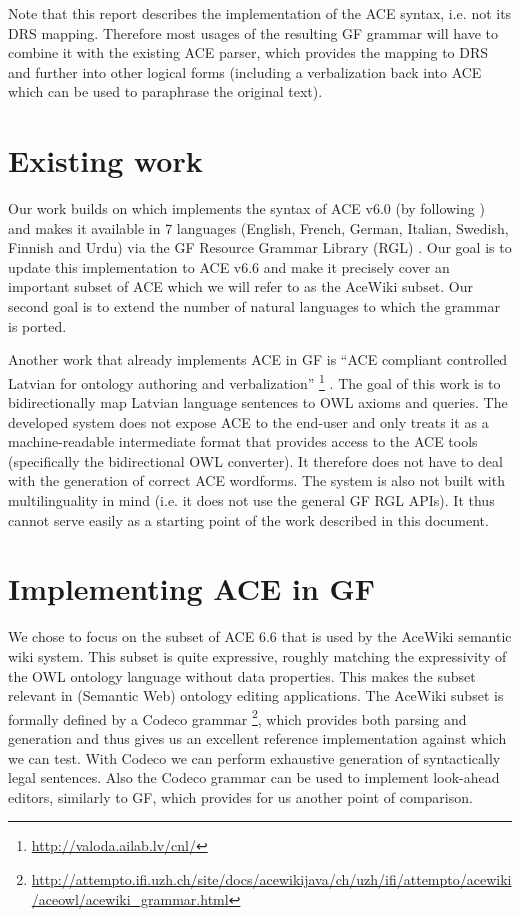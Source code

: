 \documentclass[a4paper]{article}
\begin{document}
Note that this report describes the implementation of the ACE syntax,
i.e. not its DRS mapping. Therefore most usages of the resulting GF grammar
will have to combine it with the existing ACE parser, which provides the
mapping to DRS and further into other logical forms (including a verbalization
back into ACE which can be used to paraphrase the original text).


\section{Existing work}

Our work builds on \cite{ranta:cnl2009_revised} which implements the syntax
of ACE v6.0 (by following \cite{ACE_6.0_Construction_Rules}) and makes it
available in 7 languages (English, French, German, Italian, Swedish, Finnish
and Urdu) via the GF Resource Grammar Library (RGL) \cite{ranta:lilt2009}.
Our goal is to update this implementation to ACE v6.6 and make it precisely
cover an important subset of ACE which we will refer to as the AceWiki subset.
Our second goal is to extend the number of natural languages to which
the grammar is ported.

Another work that already implements ACE in GF is
``ACE compliant controlled Latvian for ontology authoring and verbalization''
\footnote{\url{http://valoda.ailab.lv/cnl/}}
\cite{gruzitis:phd}. The goal of this work is to bidirectionally map Latvian
language sentences to OWL axioms and queries. The developed system
does not expose ACE to the end-user and only treats it as a
machine-readable intermediate format that provides access to the ACE tools
(specifically the bidirectional OWL converter).
It therefore does not have to deal with the
generation of correct ACE wordforms.
The system is also not built with multilinguality in mind
(i.e. it does not use the general GF RGL APIs). It thus cannot serve easily as
a starting point of the work described in this document.


\section{Implementing ACE in GF}

We chose to focus on the subset of ACE 6.6
\cite{ACE_6.6_Construction_Rules} that is used by the AceWiki semantic wiki
system.
This subset is
quite expressive, roughly matching the expressivity of the OWL ontology
language
\cite{OWL_2_Web_Ontology_Language_Document_Overview}
without data properties.
This makes the subset relevant in (Semantic Web) ontology editing applications.
The AceWiki subset is formally defined by a Codeco grammar
\cite{kuhn:cnl2010_revised}
\footnote{\url{http://attempto.ifi.uzh.ch/site/docs/acewikijava/ch/uzh/ifi/attempto/acewiki/aceowl/acewiki_grammar.html}},
which provides both parsing and generation and thus gives us an excellent
reference implementation against which we can test.
With Codeco we can perform exhaustive generation of syntactically legal
sentences. Also the Codeco grammar can be used to implement look-ahead
editors, similarly to GF, which provides for us another point of comparison.
\end{document}
